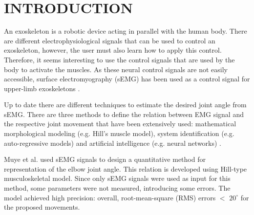 \documentclass[letterpaper, 10 pt, conference]{ieeeconf}  %
\begin{document}
\section{INTRODUCTION}
An exoskeleton is a robotic device acting in parallel with the human body. There are different electrophysiological signals that can be used to control an exoskeleton, however, the user must also learn how to apply this control. Therefore, it seems interesting to use the control signals that are used by the body to activate the muscles. As these neural control signals are not easily accessible, surface electromyography (sEMG) has been used  as a control signal for upper-limb exoskeletons \cite{Lenzi2012} . 
% 
% 






Up to date there are different techniques to estimate the desired joint angle from sEMG. There are three methods to define the relation between EMG signal and the respective joint movement that have been extensively used: mathematical morphological modeling (e.g. Hill's muscle model), system identification (e.g. auto-regressive models) and artificial intelligence (e.g. neural networks) \cite{Anam2012988}. 

Muye et al. \cite{Pang2015165} used sEMG signals to design a quantitative method for representation of the elbow joint angle. This relation is developed using Hill-type musculoskeletal model. Since only sEMG signals were used as input for this method, some parameters were not measured, introducing some errors. 
The model achieved high precision: overall, root-mean-square (RMS) errors \(<\) \(20^{\circ}\) for the proposed movements. 
% 
% 
\end{document}
